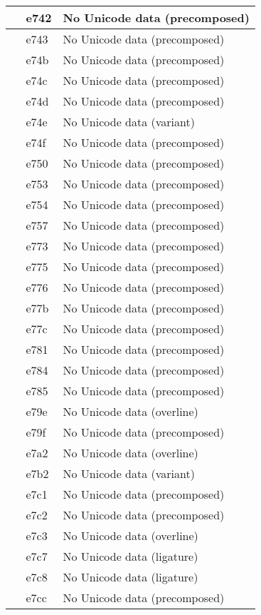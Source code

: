\documentclass[12pt,letterpaper,openany]{book}
\begin{document}
\begin{center}
\begin{supertabular}{|m{0.25in}|m{0.5in}|m{4in}|}
			 & e742 & No Unicode data (precomposed)\\\hline
			 & e743 & No Unicode data (precomposed)\\\hline
			 & e74b & No Unicode data (precomposed)\\\hline
			 & e74c & No Unicode data (precomposed)\\\hline
			 & e74d & No Unicode data (precomposed)\\\hline
			 & e74e & No Unicode data (variant)\\\hline
			 & e74f & No Unicode data (precomposed)\\\hline
			 & e750 & No Unicode data (precomposed)\\\hline
			 & e753 & No Unicode data (precomposed)\\\hline
			 & e754 & No Unicode data (precomposed)\\\hline
			 & e757 & No Unicode data (precomposed)\\\hline
			 & e773 & No Unicode data (precomposed)\\\hline
			 & e775 & No Unicode data (precomposed)\\\hline
			 & e776 & No Unicode data (precomposed)\\\hline
			 & e77b & No Unicode data (precomposed)\\\hline
			 & e77c & No Unicode data (precomposed)\\\hline
			 & e781 & No Unicode data (precomposed)\\\hline
			 & e784 & No Unicode data (precomposed)\\\hline
			 & e785 & No Unicode data (precomposed)\\\hline
			 & e79e & No Unicode data (overline)\\\hline
			 & e79f & No Unicode data (precomposed)\\\hline
			 & e7a2 & No Unicode data (overline)\\\hline
			 & e7b2 & No Unicode data (variant)\\\hline
			 & e7c1 & No Unicode data (precomposed)\\\hline
			 & e7c2 & No Unicode data (precomposed)\\\hline
			 & e7c3 & No Unicode data (overline)\\\hline
			 & e7c7 & No Unicode data (ligature)\\\hline
			 & e7c8 & No Unicode data (ligature)\\\hline
			 & e7cc & No Unicode data (precomposed)\\\hline

\end{supertabular}
\end{center}
\end{document}
